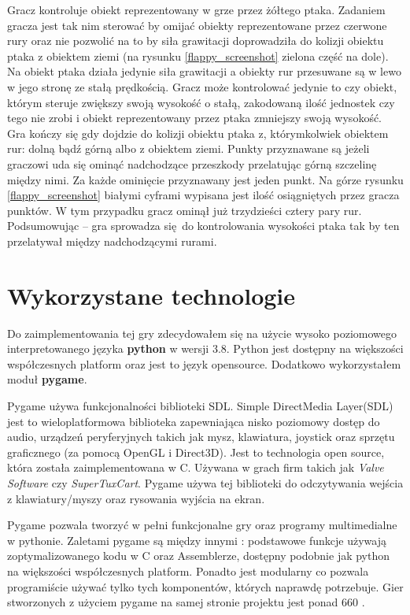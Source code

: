 \documentclass[a4paper, 12pt,oneside]{book}
\begin{document}
Gracz kontroluje obiekt reprezentowany w grze przez żółtego ptaka.
Zadaniem gracza jest tak nim sterować by omijać obiekty reprezentowane przez 
czerwone rury oraz nie pozwolić na to by siła grawitacji doprowadziła do
kolizji obiektu ptaka z obiektem ziemi (na rysunku \ref{flappy_screenshot}
zielona część na dole). Na obiekt ptaka działa jedynie siła grawitacji a
obiekty rur przesuwane są w lewo w jego stronę ze stałą prędkością. Gracz
może kontrolować jedynie to czy obiekt, którym steruje zwiększy swoją
wysokość o stałą, zakodowaną ilość jednostek czy tego nie zrobi i obiekt
reprezentowany przez ptaka zmniejszy swoją wysokość. Gra kończy się gdy
dojdzie do kolizji obiektu ptaka z, którymkolwiek obiektem rur: dolną
bądź górną albo z obiektem ziemi. Punkty przyznawane są jeżeli graczowi uda
się ominąć nadchodzące przeszkody przelatując górną szczelinę między nimi.
Za każde ominięcie przyznawany jest jeden punkt. Na górze rysunku
\ref{flappy_screenshot} białymi cyframi wypisana jest ilość osiągniętych przez
gracza punktów. W tym przypadku gracz ominął już trzydzieści cztery pary rur.
Podsumowując -- gra sprowadza się do kontrolowania wysokości ptaka tak by ten
przelatywał między nadchodzącymi rurami.

\section{Wykorzystane technologie}
Do zaimplementowania tej gry zdecydowałem się na użycie wysoko poziomowego
interpretowanego języka \textbf{python} w wersji 3.8. Python jest dostępny na
większości współczesnych platform oraz jest to język  open\dywiz source.
Dodatkowo wykorzystałem moduł \textbf{pygame}.

Pygame używa funkcjonalności biblioteki SDL. Simple DirectMedia Layer(SDL)
jest to wieloplatformowa biblioteka zapewniająca nisko poziomowy dostęp do
audio, urządzeń peryferyjnych takich jak mysz, klawiatura, joystick oraz
sprzętu graficznego (za pomocą OpenGL i Direct3D). Jest to technologia open
source, która została zaimplementowana w C. Używana w grach firm takich jak
\textit{Valve Software} czy \textit{SuperTuxCart}\cite{sdl_ref}. Pygame używa
tej biblioteki do odczytywania wejścia z klawiatury/myszy oraz rysowania
wyjścia na ekran.

Pygame pozwala tworzyć w pełni funkcjonalne gry oraz programy multimedialne
w pythonie. Zaletami pygame są między innymi : podstawowe funkcje używają
zoptymalizowanego kodu w C oraz Assemblerze, dostępny podobnie jak python na
większości współczesnych platform. Ponadto jest modularny co pozwala
programiście używać tylko tych komponentów, których naprawdę potrzebuje.
Gier stworzonych z użyciem pygame na samej stronie projektu jest ponad 660
\cite{pygame_about_ref}.
\end{document}
